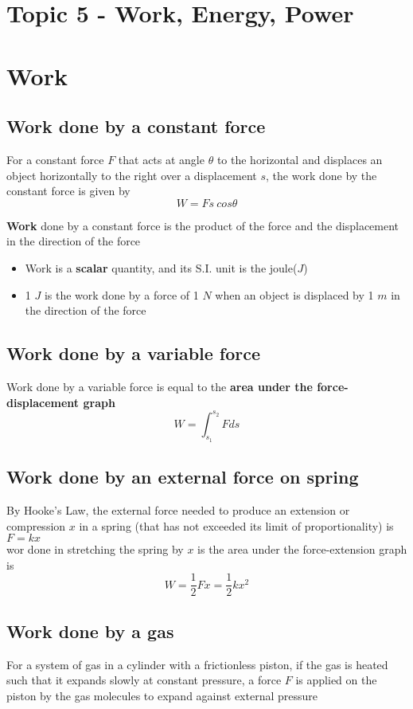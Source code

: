 \documentclass[a4paper, 10pt]{article}
\begin{document}
\section*{Topic 5 - Work, Energy, Power}

\section{Work}
\subsection{Work done by a constant force}
For a constant force $F$ that acts at angle $\theta$ to the horizontal and displaces an object horizontally to the right over a displacement $s$, the work done by the constant force is given by
\[
W = Fs\ cos\theta
\]
\begin{framed}
   \textbf{Work} done by a constant force is the product of the force and the displacement in the  direction of the force
\end{framed}	
\begin{itemize}
   \item Work is a \textbf{scalar} quantity, and its S.I. unit is the joule($J$)
   \item 1 $J$ is the work done by a force of 1 $N$ when an object is displaced by 1 $m$ in the direction of the force
\end{itemize}	

\subsection{Work done by a variable force}
Work done by a variable force is equal to the \textbf{area under the force-displacement graph}
\[
   W = \int_{s_1}^{s_2} F ds
\]

\subsection{Work done by an external force on spring}
By Hooke's Law, the external force needed to produce an extension or compression $x$ in a spring (that has not exceeded its limit of proportionality) is $F = kx$ \\
wor done in stretching the spring by $x$ is the area under the force-extension graph is
\[
W = \frac{1}{2} Fx = \frac{1}{2}kx^2
\]

\subsection{Work done by a gas}
For a system of gas in a cylinder with a frictionless piston, if the gas is heated such that it expands slowly at constant pressure, a force $F$ is applied on the piston by the gas molecules to expand against external pressure \\
\end{document}
